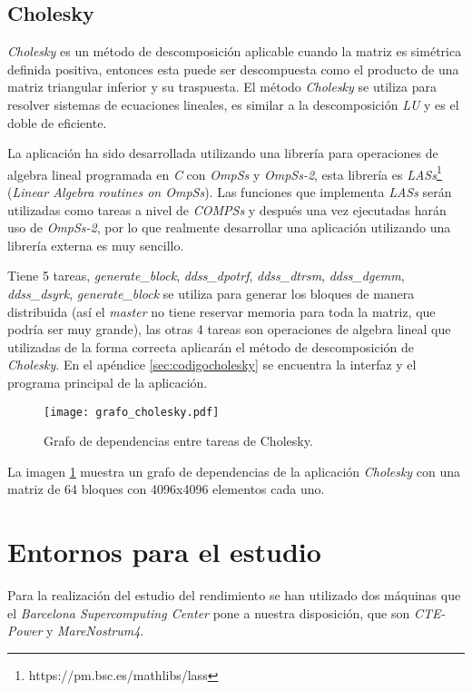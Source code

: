\subsection{Cholesky}

\textit{Cholesky} es un método de descomposición aplicable cuando la matriz es simétrica definida positiva, entonces esta puede ser descompuesta como el producto de una matriz triangular inferior y su traspuesta. El método \textit{Cholesky} se utiliza para resolver sistemas de ecuaciones lineales, es similar a la descomposición \textit{LU} y es el doble de eficiente.
\par\bigskip
La aplicación ha sido desarrollada utilizando una librería para operaciones de algebra lineal programada en \textit{C} con \textit{OmpSs} y \textit{OmpSs-2}, esta librería es \textit{LASs}\footnote{https://pm.bsc.es/mathlibs/lass} (\textit{Linear Algebra routines on OmpSs}). Las funciones que implementa \textit{LASs} serán utilizadas como tareas a nivel de \textit{COMPSs} y después una vez ejecutadas harán uso de \textit{OmpSs-2}, por lo que realmente desarrollar una aplicación utilizando una librería externa es muy sencillo.
\par\bigskip
Tiene 5 tareas, \textit{generate\_block}, \textit{ddss\_dpotrf}, \textit{ddss\_dtrsm}, \textit{ddss\_dgemm}, \textit{ddss\_dsyrk}, \textit{generate\_block} se utiliza para generar los bloques de manera distribuida (así el \textit{master} no tiene reservar memoria para toda la matriz, que podría ser muy grande), las otras 4 tareas son operaciones de algebra lineal que utilizadas de la forma correcta aplicarán el método de descomposición de \textit{Cholesky}.
En el apéndice \ref{sec:codigocholesky} se encuentra la interfaz y el programa principal de la aplicación. 

\begin{figure}[h]
	\centering 
	\caption{Grafo de dependencias entre tareas de Cholesky.}
	\texttt{[image: grafo\_cholesky.pdf]}
	\label{fig:grafocholesky}
\end{figure}

La imagen \ref{fig:grafocholesky} muestra un grafo de dependencias de la aplicación \textit{Cholesky} con una matriz de 64 bloques con 4096x4096 elementos cada uno. 

\section{Entornos para el estudio}

Para la realización del estudio del rendimiento se han utilizado dos máquinas que el \textit{Barcelona Supercomputing Center} pone a nuestra disposición, que son \textit{CTE-Power} y \textit{MareNostrum4}.

